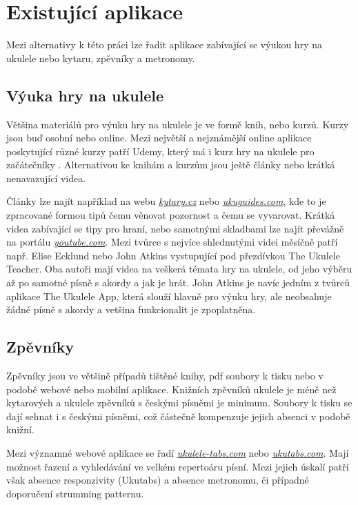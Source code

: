 \section{Existující aplikace}
\label{sc:existing_apps}
Mezi alternativy k této práci lze řadit aplikace zabívající se výukou hry na ukulele nebo kytaru, zpěvníky a metronomy.

\subsection{Výuka hry na ukulele}
\label{ss:existing_teaching_apps}
Většina materiálů pro výuku hry na ukulele je ve formě knih, nebo kurzů.
Kurzy jsou buď osobní nebo online. Mezi největší a nejznámější online aplikace poskytující různé kurzy patří Udemy, který má i kurz hry na ukulele pro začátečníky \cite{puchmayr_complete}. Alternativou ke knihám a kurzům jsou ještě články nebo krátká nenavazující videa.

Články lze najít například na webu \href{www.kytary.cz}{\emph{kytary.cz}} nebo \href{www.ukuguides.com}{\emph{ukuguides.com}}, kde to je zpracované formou tipů čemu věnovat pozornost a čemu se vyvarovat. Krátká videa zabívající se tipy pro hraní, nebo samotnými skladbami lze najít převážně na portálu \href{www.youtube.com}{\emph{youtube.com}}. Mezi tvůrce s nejvíce shlednutými videi měsíčně patří např. Elise Ecklund nebo John Atkins vystupující pod přezdívkou The Ukulele Teacher. Oba autoři mají videa na veškerá témata hry na ukulele, od jeho výběru až po samotné písně s akordy a jak je hrát. John Atkins je navíc jedním z tvůrců aplikace The Ukulele App, která slouží hlavně pro výuku hry, ale neobsahuje žádné písně s akordy a vetšina funkcionalit je zpoplatněna.

\subsection{Zpěvníky}
\label{ss:songbooks}
Zpěvníky jsou ve většině případů tištěné knihy, pdf soubory k tisku nebo v podobě webové nebo mobilní aplikace. Knižních zpěvníků ukulele je méně než kytarových a ukulele zpěvníků s českými písněmi je minimum. Soubory k tisku se dají sehnat i s českými písněmi, což částečně kompenzuje jejich absenci v podobě knižní.

Mezi významné webové aplikace se řadí \href{www.ukulele-tabs.com}{\emph{ukulele-tabs.com}} nebo \href{www.ukutabs.com}{\emph{ukutabs.com}}. Mají možnost řazení a vyhledávání ve velkém repertoáru písní. Mezi jejich úskalí patří však absence responzivity (Ukutabs) a absence metronomu, či případné doporučení strumming patternu.

